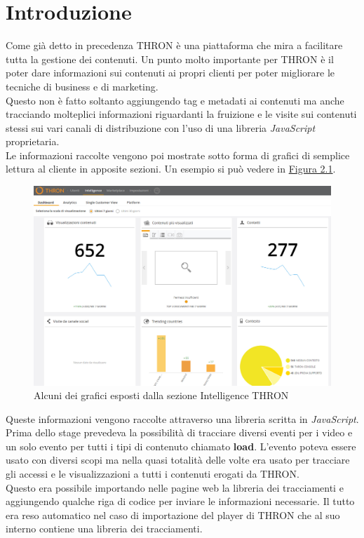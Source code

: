 \documentclass[a4paper, 12pt, twoside, openright]{book}
\begin{document}
\section{Introduzione}
Come già detto in precedenza THRON è una piattaforma che mira a facilitare tutta la gestione dei contenuti. Un punto molto importante per THRON è il poter dare informazioni sui contenuti ai propri clienti per poter migliorare le tecniche di business e di marketing.\\
Questo non è fatto soltanto aggiungendo tag e metadati ai contenuti ma anche tracciando molteplici informazioni riguardanti la fruizione e le visite sui contenuti stessi sui vari canali di distribuzione con l'uso di una libreria \textit{JavaScript} proprietaria.\\
Le informazioni raccolte vengono poi mostrate sotto forma di grafici di semplice lettura al cliente in apposite sezioni. Un esempio si può vedere in \hyperref[reports-example]{Figura 2.1}.\\
\begin{figure}[h] %
	\centering
	\label{reports-example}
	\includegraphics[width=1.0\textwidth]{images/reports-example.jpg}
	\caption{Alcuni dei grafici esposti dalla sezione Intelligence THRON}
\end{figure} 

Queste informazioni vengono raccolte attraverso una libreria scritta in \textit{JavaScript}. Prima dello stage prevedeva la possibilità di tracciare diversi eventi per i video e un solo evento per tutti i tipi di contenuto chiamato \textbf{load}. L'evento poteva essere usato con diversi scopi ma nella quasi totalità delle volte era usato per tracciare gli accessi e le visualizzazioni a tutti i contenuti erogati da THRON.\\
Questo era possibile importando nelle pagine web la libreria dei tracciamenti e aggiungendo qualche riga di codice per inviare le informazioni necessarie. Il tutto era reso automatico nel caso di importazione del player di THRON che al suo interno contiene una libreria dei tracciamenti.\\
\end{document}
